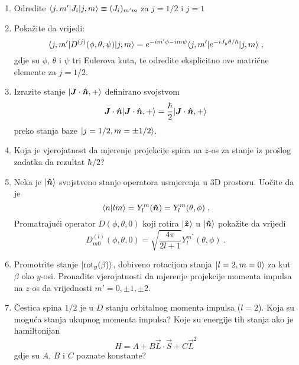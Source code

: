 \begin{enumerate}[label=\arabic{chapter}.\arabic*.]

    \item \label{zad:matj}
Odredite $\langle j, m' |J_{i} | j, m \rangle \equiv (J_i)_{m' m}$ za 
$j=1/2$ i $j=1$

\item
Pokažite da vrijedi: 
\begin{equation}
\langle j, m' | D^{(j)}(\phi, \theta, \psi) | j, m \rangle = e^{-im'\phi-im\psi}
\langle j, m' | e^{-i J_y \theta /\hbar} | j, m \rangle \;,
\end{equation}
gdje su $\phi$, $\theta$ i $\psi$ tri Eulerova kuta,
te odredite eksplicitno ove matrične elemente za $j=1/2$.

\item
Izrazite stanje $\ket{\vec{J}\cdot\unitn, +}$ definirano svojstvom
\begin{displaymath}
    \vec{J}\cdot\unitn \ket{\vec{J}\cdot\unitn, +} =
  \frac{\hbar}{2} \ket{\vec{J}\cdot\unitn, +}
\end{displaymath}
preko stanja baze $| j=1/2, m=\pm 1/2 \rangle$.

\item
Koja je vjerojatnost da mjerenje projekcije spina na $z$-os za stanje iz
prošlog zadatka da rezultat $\hbar/2$?

\item 
Neka je $\ket{\unitn}$ svojstveno stanje operatora usmjerenja u 3D
prostoru. Uočite da je
\begin{displaymath}
     \bra{n}lm\rangle = Y^{m}_l (\unitn) = Y^{m}_l (\theta, \phi) \;.
\end{displaymath}
Promatrajući operator $D(\phi,\theta,0)$ koji rotira $\ket{\hat{\vec{z}}}$
u $\ket{\unitn}$ pokažite da vrijedi
\begin{displaymath}
    D^{(l)}_{m0}(\phi,\theta,0)=\sqrt{\frac{4\pi}{2l+1}}
 Y^{m^*}_l (\theta, \phi)\;.
\end{displaymath}

\item
Promotrite stanje $| \text{rot}_y(\beta) \rangle$, dobiveno rotacijom stanja
$| l=2, m=0 \rangle$ za kut $\beta$ oko $y$-osi. Pronađite vjerojatnosti da
mjerenje projekcije momenta impulsa na $z$-os da vrijednosti
$m'=0,\pm 1, \pm 2$.

\item Čestica spina $1/2$ je u $D$ stanju orbitalnog momenta impulsa
($l=2$). Koja su moguća stanja ukupnog momenta impulsa? Koje su energije
tih stanja ako je hamiltonijan 
\[ H = A + B \vec{L}\cdot\vec{S} + C \vec{L}^2 \]
gdje su $A$, $B$ i $C$ poznate konstante?


\end{enumerate}
